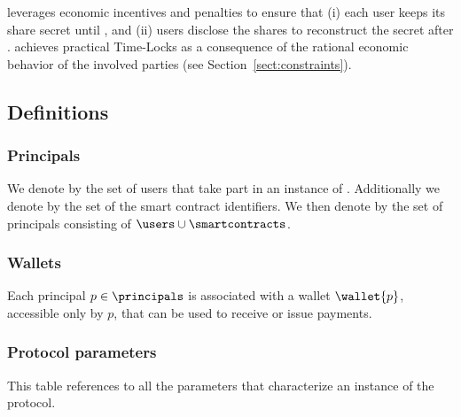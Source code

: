 \shortname leverages economic incentives and penalties to ensure that (i) each user keeps its share secret until \td, and (ii) users disclose the shares to reconstruct the secret after \td.
%
%
%
\shortname achieves practical Time-Locks as a consequence of the rational economic behavior of the involved parties
(see Section~\ref{sect:constraints}).

\subsection{Definitions}

\subsubsection*{Principals}
We denote by \users the set of users that take part in an instance of \shortname.
Additionally we denote by \smartcontracts the set of the smart contract identifiers.
We then denote by \principals the set of principals consisting of $\users \cup \smartcontracts$.

\medskip

\subsubsection*{Wallets}
Each principal $p \in \principals$ is associated with a wallet $\wallet{p}$, accessible only by $p$, that can be used to receive or issue payments.

\medskip

\subsubsection*{Protocol parameters}
This table references to all the parameters that characterize an instance of the \shortname protocol. \\

